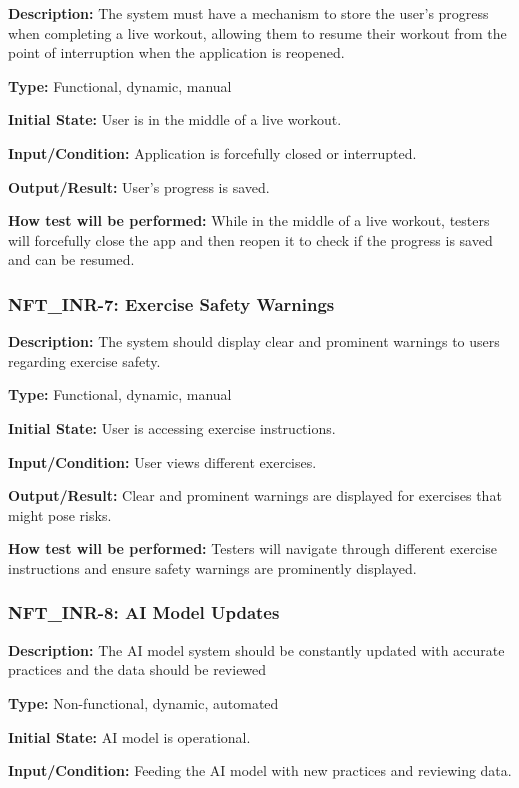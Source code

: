 \documentclass[12pt, titlepage]{article}
\begin{document}
\textbf{Description: }The system must have a mechanism to store the user’s progress when completing a live workout, allowing them to resume their workout from the point of interruption when the application is reopened.

\textbf{Type: }Functional, dynamic, manual

\textbf{Initial State:} User is in the middle of a live workout.

\textbf{Input/Condition:} Application is forcefully closed or interrupted.

\textbf{Output/Result: }User's progress is saved.

\textbf{How test will be performed: }While in the middle of a live workout, testers will forcefully close the app and then reopen it to check if the progress is saved and can be resumed.


\subsubsection*{\textbf{NFT\_INR-7: Exercise Safety Warnings}
}

\textbf{Description: }The system should display clear and prominent warnings to users regarding exercise safety.

\textbf{Type: }Functional, dynamic, manual

\textbf{Initial State:} User is accessing exercise instructions.

\textbf{Input/Condition: }User views different exercises.

\textbf{Output/Result:} Clear and prominent warnings are displayed for exercises that might pose risks.

\textbf{How test will be performed: }Testers will navigate through different exercise instructions and ensure safety warnings are prominently displayed.


\subsubsection*{\textbf{NFT\_INR-8: AI Model Updates}
}

\textbf{Description: }The AI model system should be constantly updated with accurate practices and the data should be reviewed

\textbf{Type: }Non-functional, dynamic, automated

\textbf{Initial State:} AI model is operational.

\textbf{Input/Condition:} Feeding the AI model with new practices and reviewing data.
\end{document}
